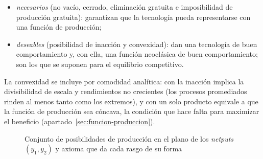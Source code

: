 \documentclass[11pt]{article}
\begin{document}
\begin{itemize}
{\begin{itemize}
\item \emph{necesarios} (no vacío, cerrado, eliminación gratuita e imposibilidad de producción gratuita): garantizan que la tecnología pueda representarse con una función de producción;
\item \emph{deseables} (posibilidad de inacción y convexidad): dan una tecnología de buen comportamiento y, con ella, una función neoclásica de buen comportamiento; son los que se suponen para el equilibrio competitivo.
\end{itemize}
La convexidad se incluye por comodidad analítica: con la inacción implica la divisibilidad de escala y rendimientos no crecientes (los procesos promediados rinden al menos tanto como los extremos), y con un solo producto equivale a que la función de producción sea cóncava, la condición que hace falta para maximizar el beneficio (apartado~\ref{sec:funcion-produccion}).}
\end{itemize}

\begin{figure}[H]
\centering
\caption{Conjunto de posibilidades de producción en el plano de los \emph{netputs} $(y_1,y_2)$ y axioma que da cada rasgo de su forma}\label{fig:conjunto-produccion}
\end{figure}
\end{document}
